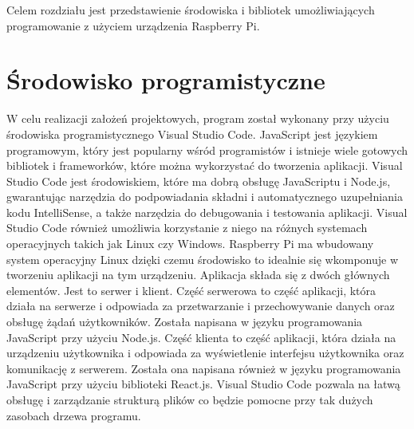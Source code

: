 Celem rozdziału jest przedstawienie środowiska i bibliotek umożliwiających programowanie z użyciem urządzenia Raspberry Pi.

\section{Środowisko programistyczne}
W celu realizacji założeń projektowych, program został wykonany przy użyciu środowiska programistycznego Visual Studio Code. JavaScript jest językiem programowym, który jest popularny wśród programistów i istnieje wiele gotowych bibliotek i frameworków, które można wykorzystać do tworzenia aplikacji. Visual Studio Code jest środowiskiem, które ma dobrą obsługę JavaScriptu i Node.js, gwarantując narzędzia do podpowiadania składni i automatycznego uzupełniania kodu IntelliSense, a także narzędzia do debugowania i testowania aplikacji. Visual Studio Code również umożliwia korzystanie z niego na różnych systemach operacyjnych takich jak Linux czy Windows. Raspberry Pi ma wbudowany system operacyjny Linux dzięki czemu środowisko to idealnie się wkomponuje w tworzeniu aplikacji na tym urządzeniu. Aplikacja składa się z dwóch głównych elementów. Jest to serwer i klient. Część serwerowa to część aplikacji, która działa na serwerze i odpowiada za przetwarzanie i przechowywanie danych oraz obsługę żądań użytkowników. Została napisana w języku programowania JavaScript przy użyciu Node.js. Część klienta to część aplikacji, która działa na urządzeniu użytkownika i odpowiada za wyświetlenie interfejsu użytkownika oraz komunikację z serwerem. Została ona napisana również w języku programowania JavaScript przy użyciu biblioteki React.js. Visual Studio Code pozwala na łatwą obsługę i zarządzanie strukturą plików co będzie pomocne przy tak dużych zasobach drzewa programu.

